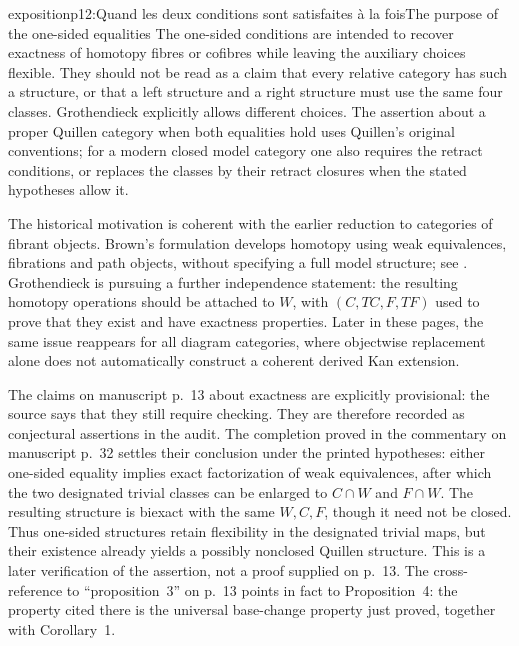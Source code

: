\begin{dcomment}{exposition}{p12:Quand les deux conditions sont satisfaites à la fois}{The purpose of the one-sided equalities}
The one-sided conditions are intended to recover exactness of homotopy fibres or cofibres while leaving the auxiliary choices flexible. They should not be read as a claim that every relative category has such a structure, or that a left structure and a right structure must use the same four classes. Grothendieck explicitly allows different choices. The assertion about a proper Quillen category when both equalities hold uses Quillen's original conventions; for a modern closed model category one also requires the retract conditions, or replaces the classes by their retract closures when the stated hypotheses allow it.

The historical motivation is coherent with the earlier reduction to categories of fibrant objects. Brown's formulation develops homotopy using weak equivalences, fibrations and path objects, without specifying a full model structure; see \citet[\S1, pp.~420--421]{Brown1973}. Grothendieck is pursuing a further independence statement: the resulting homotopy operations should be attached to $W$, with $(C,TC,F,TF)$ used to prove that they exist and have exactness properties. Later in these pages, the same issue reappears for all diagram categories, where objectwise replacement alone does not automatically construct a coherent derived Kan extension.

The claims on manuscript p.~13 about exactness are explicitly provisional: the source says that they still require checking. They are therefore recorded as conjectural assertions in the audit. The completion proved in the commentary on manuscript p.~32 settles their conclusion under the printed hypotheses: either one-sided equality implies exact factorization of weak equivalences, after which the two designated trivial classes can be enlarged to $C\cap W$ and $F\cap W$. The resulting structure is biexact with the same $W,C,F$, though it need not be closed. Thus one-sided structures retain flexibility in the designated trivial maps, but their existence already yields a possibly nonclosed Quillen structure. This is a later verification of the assertion, not a proof supplied on p.~13. The cross-reference to ``proposition~3'' on p.~13 points in fact to Proposition~4: the property cited there is the universal base-change property just proved, together with Corollary~1.
\end{dcomment}



